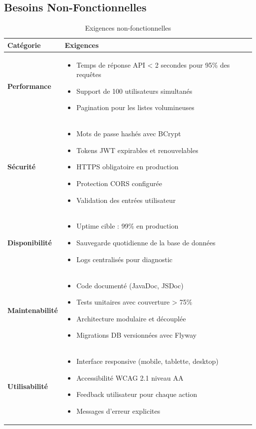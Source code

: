 \documentclass[12pt,a4paper]{report}
\begin{document}
\subsection{Besoins Non-Fonctionnelles}

\begin{table}[H]
\centering
\caption{Exigences non-fonctionnelles}
\begin{tabular}{|p{3.5cm}|p{10cm}|}
\hline
\textbf{Catégorie} & \textbf{Exigences} \\
\hline
\textbf{Performance} & 
\begin{itemize}[leftmargin=*, nosep]
    \item Temps de réponse API < 2 secondes pour 95\% des requêtes
    \item Support de 100 utilisateurs simultanés
    \item Pagination pour les listes volumineuses
\end{itemize} \\
\hline
\textbf{Sécurité} & 
\begin{itemize}[leftmargin=*, nosep]
    \item Mots de passe hashés avec BCrypt
    \item Tokens JWT expirables et renouvelables
    \item HTTPS obligatoire en production
    \item Protection CORS configurée
    \item Validation des entrées utilisateur
\end{itemize} \\
\hline
\textbf{Disponibilité} & 
\begin{itemize}[leftmargin=*, nosep]
    \item Uptime cible : 99\% en production
    \item Sauvegarde quotidienne de la base de données
    \item Logs centralisés pour diagnostic
\end{itemize} \\
\hline
\textbf{Maintenabilité} & 
\begin{itemize}[leftmargin=*, nosep]
    \item Code documenté (JavaDoc, JSDoc)
    \item Tests unitaires avec couverture > 75\%
    \item Architecture modulaire et découplée
    \item Migrations DB versionnées avec Flyway
\end{itemize} \\
\hline
\textbf{Utilisabilité} & 
\begin{itemize}[leftmargin=*, nosep]
    \item Interface responsive (mobile, tablette, desktop)
    \item Accessibilité WCAG 2.1 niveau AA
    \item Feedback utilisateur pour chaque action
    \item Messages d'erreur explicites
\end{itemize} \\
\hline
\end{tabular}
\end{table}
\end{document}
